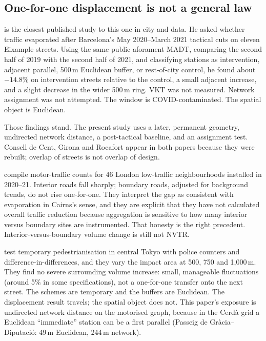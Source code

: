\documentclass[a4paper,fleqn]{cas-dc}
\begin{document}
\subsection{One-for-one displacement is not a general law}

\citet{NelloDeakin2022} is the closest published study to this one in city and
data. He asked whether traffic evaporated after Barcelona's May 2020--March
2021 tactical cuts on eleven Eixample streets. Using the same public
aforament MADT, comparing the second half of 2019 with the second half of
2021, and classifying stations as intervention, adjacent parallel, 500\,m
Euclidean buffer, or rest-of-city control, he found about $-14.8\%$ on
intervention streets relative to the control, a small adjacent increase, and
a slight decrease in the wider 500\,m ring. VKT was not measured. Network
assignment was not attempted. The window is COVID-contaminated. The spatial
object is Euclidean.

Those findings stand. The present study uses a later, permanent geometry,
undirected network distance, a post-tactical baseline, and an assignment
test. Consell de Cent, Girona and Rocafort appear in both papers because they
were rebuilt; overlap of streets is not overlap of design.

\citet{Thomas2024} compile motor-traffic counts for 46 London low-traffic
neighbourhoods installed in 2020--21. Interior roads fall sharply; boundary
roads, adjusted for background trends, do not rise one-for-one. They interpret
the gap as consistent with evaporation in Cairns's sense, and they are explicit
that they have not calculated overall traffic reduction because aggregation is
sensitive to how many interior versus boundary sites are instrumented. That
honesty is the right precedent. Interior-versus-boundary volume change is
still not NVTR.

\citet{Parady2025} test temporary pedestrianisation in central Tokyo with
police counters and difference-in-differences, and they vary the impact area
at 500, 750 and 1{,}000\,m. They find no severe surrounding volume increase:
small, manageable fluctuations (around 5\% in some specifications), not a
one-for-one transfer onto the next street. The schemes are temporary and the buffers
are Euclidean. The displacement result travels; the spatial object does not.
This paper's exposure is undirected network distance on the motorised graph,
because in the Cerd\`a grid a Euclidean ``immediate'' station can be a first
parallel (Passeig de Gr\`acia--Diputaci\'o: 49\,m Euclidean, 244\,m network).
\end{document}
